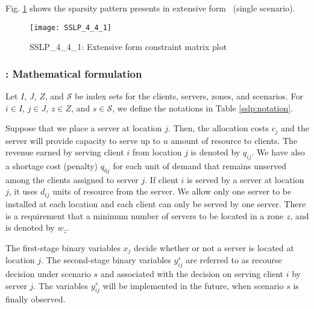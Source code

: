 Fig. \ref{fig:sslp_sparsity} shows the sparsity pattern presents in extensive form \sslp\ (single scenario).
\begin{figure}[]
	\centering
	\texttt{[image: SSLP\_4\_4\_1]}
	\caption{SSLP\_4\_4\_1: Extensive form constraint matrix plot}
	\label{fig:sslp_sparsity}
\end{figure}

\subsubsection{\sslp: Mathematical formulation}
Let $I$, $J$, $Z$, and $\mathcal{S}$ be index sets for the clients, servers, zones, and scenarios. For $i\in I$, $j\in J$, $z\in Z$, and $s\in\mathcal{S}$, we define the notations in Table \ref{sslp:notation}.

Suppose that we place a server at location $j$. Then, the allocation costs $c_j$ and the server will provide capacity to serve up to $u$ amount of resource to clients. The revenue earned by serving client $i$ from location $j$ is denoted by $q_{ij}$. We have also a shortage cost (penalty) $q_{0j}$ for each unit of demand that remains unserved among the clients assigned to server $j$. If client $i$ is served by a server at location $j$, it uses $d_{ij}$ units of resource from the server. We allow only one server to be installed at each location and each client can only be served by one server. There is a requirement that a minimum number of servers to be located in a zone $z$, and is denoted by $w_z$. 

The first-stage binary variables $x_j$ decide whether or not a server is located at location $j$. The second-stage binary variables $y_{ij}^s$ are referred to as recourse decision under scenario $s$ and associated with the decision on serving client $i$ by server $j$. The variables $y_{ij}^s$ will be implemented in the future, when scenario $s$ is finally observed.

